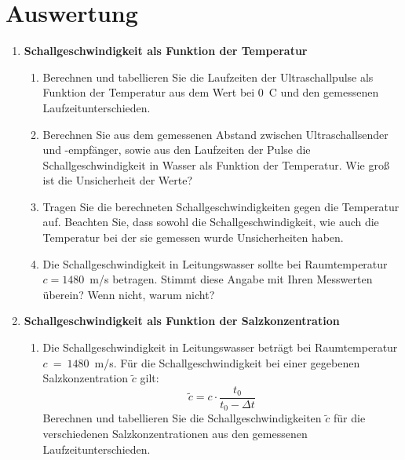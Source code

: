 \section{Auswertung} 

\begin{enumerate}
	\item\textbf{Schallgeschwindigkeit als Funktion der Temperatur}
	\begin{enumerate}
		\item Berechnen und tabellieren Sie die Laufzeiten der Ultraschallpulse als Funktion der Temperatur aus dem Wert bei 0\degree~C und den gemessenen Laufzeitunterschieden.
		\item Berechnen Sie aus dem gemessenen Abstand zwischen Ultraschallsender und -empfänger, sowie aus den Laufzeiten der Pulse die Schallgeschwindigkeit in Wasser als Funktion der Temperatur. Wie groß ist die Unsicherheit der Werte?
		\item Tragen Sie die berechneten Schallgeschwindigkeiten gegen die Temperatur auf. Beachten Sie, dass sowohl die Schallgeschwindigkeit, wie auch die Temperatur bei der sie gemessen wurde Unsicherheiten haben.
		\item Die Schallgeschwindigkeit in Leitungswasser sollte bei Raumtemperatur $c=1480$~m/s betragen. Stimmt diese Angabe mit Ihren Messwerten überein? Wenn nicht, warum nicht?
	\end{enumerate}
	\item \textbf{Schallgeschwindigkeit als Funktion der Salzkonzentration}
	\begin{enumerate}
		\item Die Schallgeschwindigkeit in Leitungswasser beträgt bei Raumtemperatur $c~=~1480$~m/s. Für die Schallgeschwindigkeit bei einer gegebenen Salzkonzentration $\tilde{c}$ gilt:
		\begin{equation}
			\tilde{c} = c\cdot\frac{t_0}{t_0-\Delta t}
		\end{equation}
		Berechnen und tabellieren Sie die Schallgeschwindigkeiten $\tilde{c}$ für die verschiedenen Salzkonzentrationen aus den gemessenen Laufzeitunterschieden. 

\end{enumerate}
\end{enumerate}
